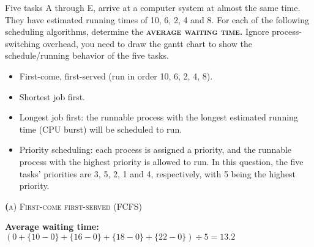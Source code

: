 \documentclass{article}
\newcommand{\smallcaps}[1]{\textsc{\textbf #1}\\}
\begin{document}
    Five tasks A through E, arrive at a computer system at almost the same time.
    They have estimated running times of 10, 6, 2, 4 and 8. For each of the following scheduling algorithms, determine the \textsc{\textbf{average waiting time.}} Ignore process-switching overhead, you need to draw the gantt chart to show the schedule/running behavior of the five tasks.

    \begin{itemize}
      \item First-come, first-served (run in order 10, 6, 2, 4, 8).
      \item Shortest job first.
      \item Longest job first: the runnable process with the longest estimated running time (CPU burst) will be scheduled to run.
      \item Priority scheduling: each process is assigned a priority, and the runnable process with the highest priority is allowed to run. In this question, the five tasks' priorities are 3, 5, 2, 1 and 4, respectively, with 5 being the highest priority.
    \end{itemize}

    \begin{center}
      \smallcaps{(a) First-come first-served (FCFS)}

      \textbf{Average waiting time:} $(0 + \{10 - 0\} + \{16 - 0\} + \{18 - 0\} + \{22 - 0\}) \div 5 = 13.2$ \\
    \end{center}
\end{document}
